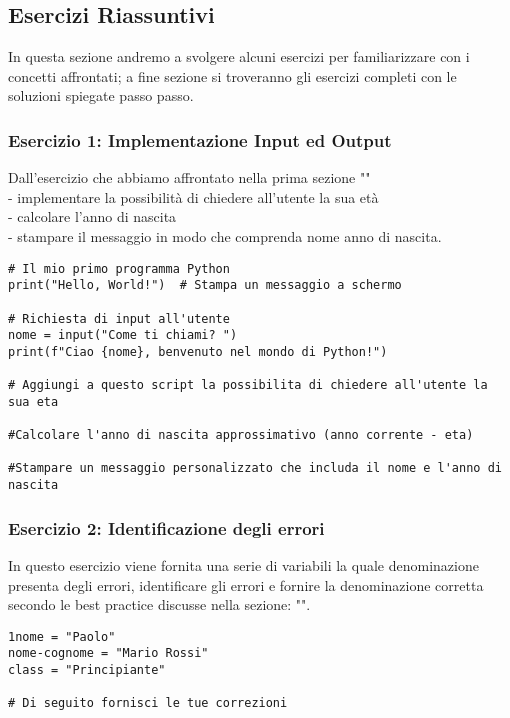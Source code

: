 \newpage

\subsection{Esercizi Riassuntivi}\label{EserciziFondamenti}
In questa sezione andremo a svolgere alcuni esercizi per familiarizzare con i concetti affrontati; a fine sezione si troveranno gli esercizi completi con le soluzioni spiegate passo passo.

\subsubsection{Esercizio 1: Implementazione Input ed Output}\label{esercizioFond:1}
Dall'esercizio che abbiamo affrontato nella prima sezione ""\\
- implementare la possibilità di chiedere all'utente la sua età\\
- calcolare l'anno di nascita \\
- stampare il messaggio in modo che comprenda nome anno di nascita.
\begin{lstlisting}
# Il mio primo programma Python
print("Hello, World!")  # Stampa un messaggio a schermo

# Richiesta di input all'utente
nome = input("Come ti chiami? ")
print(f"Ciao {nome}, benvenuto nel mondo di Python!")

# Aggiungi a questo script la possibilita di chiedere all'utente la sua eta

#Calcolare l'anno di nascita approssimativo (anno corrente - eta)

#Stampare un messaggio personalizzato che includa il nome e l'anno di nascita
\end{lstlisting}

\subsubsection{Esercizio 2: Identificazione degli errori}\label{esercizioFond:2}
In questo esercizio viene fornita una serie di variabili la quale denominazione presenta degli errori, identificare gli errori e fornire la denominazione corretta secondo le best practice discusse nella sezione: "".
\begin{lstlisting}
1nome = "Paolo"  
nome-cognome = "Mario Rossi"  
class = "Principiante"  

# Di seguito fornisci le tue correzioni
\end{lstlisting}

